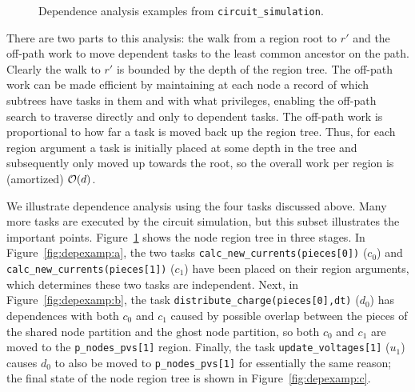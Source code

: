 \begin{figure}
{\label{fig:depexamp:c}
}
\label{fig:depexamp}
\caption{Dependence analysis examples from {\tt circuit\_simulation}.}
\end{figure}

There are two parts to this analysis:
the walk from a region root to $r'$ and the off-path work
to move dependent tasks to the least common ancestor on the path.
Clearly the walk to $r'$ is bounded by the depth of the region tree.
The off-path work can be made efficient by maintaining at each node a
record of which subtrees have tasks in them and with what privileges,
enabling the off-path search to traverse directly and only to
dependent tasks.  The off-path work is proportional to how far a task
is moved back up the region tree.  Thus, for each region argument a
task is initially placed at some depth in the tree and subsequently
only moved up towards the root, so the overall work per region is (amortized)
${\cal O}(d)$.  

We illustrate dependence analysis using the four tasks discussed
above.  Many more tasks are executed by the circuit simulation,
but this subset illustrates the important
points. Figure~\ref{fig:depexamp} shows the node region tree in three
stages.  In Figure~\ref{fig:depexamp:a}, the two tasks
{\tt calc\_new\_currents(pieces[0])} ($c_0$) and {\tt
    calc\_new\_currents(pieces[1])} ($c_1$) have been placed on their region arguments,
  which determines these two tasks are independent.
Next, in Figure~\ref{fig:depexamp:b}, the task {\tt distribute\_charge(pieces[0],dt)} ($d_0$)
has dependences with both $c_0$ and $c_1$ caused by possible overlap between the pieces of the
shared node partition and the ghost node partition, so both $c_0$ and $c_1$ are moved to
the {\tt p\_nodes\_pvs[1]} region.  Finally, the task {\tt update\_voltages[1]} ($u_1$) causes
$d_0$ to also be moved to {\tt p\_nodes\_pvs[1]} for essentially the same reason; the final
state of the node region tree is shown in Figure~\ref{fig:depexamp:c}.


